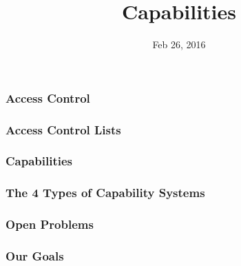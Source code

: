 \documentclass{beamer}
\title{Capabilities}
\date{Feb 26, 2016}
\begin{document}
\frame{\titlepage}

\begin{frame}
  \frametitle{Access Control}

\end{frame}

\begin{frame}
  \frametitle{Access Control Lists}
\end{frame}

\begin{frame}
  \frametitle{Capabilities}
\end{frame}

\begin{frame}
  \frametitle{The 4 Types of Capability Systems}
\end{frame}

\begin{frame}
  \frametitle{Open Problems}
\end{frame}

\begin{frame}
  \frametitle{Our Goals}
\end{frame}
\end{document}
